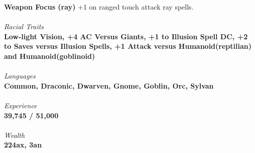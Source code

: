 \documentclass[letterpaper]{article}
\newcommand{\e}[1]{\emph{#1}}
\newcommand{\B}[1]{\textbf{#1}}
\begin{document}
\B{Weapon Focus (ray)} +1 on ranged touch attack ray spells. \\
\\
\e{Racial Traits} \\
\B{Low-light Vision, +4 AC Versus Giants, +1 to Illusion Spell DC, +2 to Saves versus Illusion Spells, +1 Attack versus Humanoid(reptilian) and Humanoid(goblinoid)} \\
\\
\e{Languages} \\
\B{Common, Draconic, Dwarven, Gnome, Goblin, Orc, Sylvan} \\
\\
{\e{Experience}} \\
\B{39,745 / 51,000} \\
\\
{\e{Wealth}} \\
\B{224ax, 3an}
\end{document}
